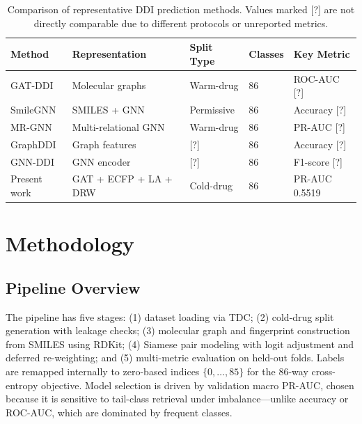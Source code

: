 \documentclass[11pt,a4paper]{report}
\begin{document}
\begin{table}[H]
\centering
\caption{Comparison of representative DDI prediction methods. Values marked [?] are not directly comparable due to different protocols or unreported metrics.}
\label{tab:lit_comparison}
\begin{tabular}{lllll}
\toprule
Method & Representation & Split Type & Classes & Key Metric \\
\midrule
GAT-DDI \cite{feng2022gnnddi}    & Molecular graphs        & Warm-drug      & 86 & ROC-AUC [?] \\
SmileGNN \cite{han2022smilegnn}  & SMILES + GNN           & Permissive     & 86 & Accuracy [?] \\
MR-GNN \cite{xiong2023mrgnn}     & Multi-relational GNN   & Warm-drug      & 86 & PR-AUC [?] \\
GraphDDI \cite{gupta2024graphddi}& Graph features         & [?]            & 86 & Accuracy [?] \\
GNN-DDI \cite{abbas2025gnnddi}   & GNN encoder            & [?]            & 86 & F1-score [?] \\
Present work                     & GAT + ECFP + LA + DRW  & Cold-drug      & 86 & PR-AUC 0.5519 \\
\bottomrule
\end{tabular}
\end{table}

\chapter{Methodology}

\section{Pipeline Overview}

The pipeline has five stages: (1) dataset loading via TDC; (2) cold-drug split generation with leakage checks; (3) molecular graph and fingerprint construction from SMILES using RDKit; (4) Siamese pair modeling with logit adjustment and deferred re-weighting; and (5) multi-metric evaluation on held-out folds. Labels are remapped internally to zero-based indices \(\{0,\dots,85\}\) for the 86-way cross-entropy objective. Model selection is driven by validation macro PR-AUC, chosen because it is sensitive to tail-class retrieval under imbalance---unlike accuracy or ROC-AUC, which are dominated by frequent classes.
\end{document}
